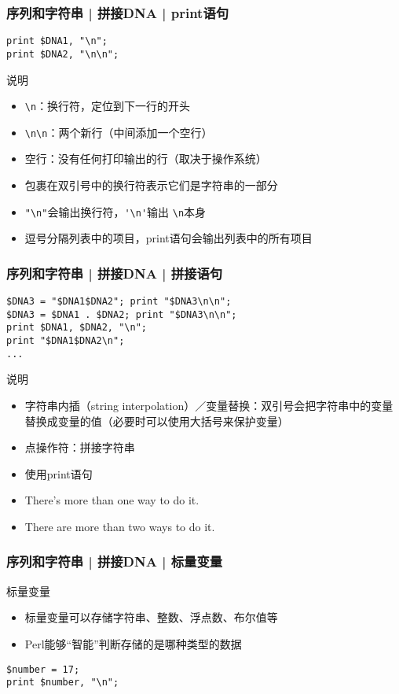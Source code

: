 \begin{frame}[fragile]
  \frametitle{序列和字符串 | 拼接DNA | \alert{print语句}}
  \vspace{-1.5em}
\begin{lstlisting}
print $DNA1, "\n";
print $DNA2, "\n\n";
\end{lstlisting}
\pause
\begin{block}{说明}
  \begin{itemize}
    \item \verb|\n|：换行符，定位到下一行的开头
    \item \verb|\n\n|：两个新行（中间添加一个空行）
    \item 空行：没有任何打印输出的行（取决于操作系统）
    \item 包裹在双引号中的换行符表示它们是字符串的一部分
    \item \verb|"\n"|会输出换行符，\verb|'\n'|输出 \verb|\n|本身
    \item 逗号分隔列表中的项目，print语句会输出列表中的所有项目
  \end{itemize}
\end{block}
\end{frame}

\begin{frame}[fragile]
  \frametitle{序列和字符串 | 拼接DNA | \alert{拼接语句}}
  \vspace{-1.5em}
\begin{lstlisting}
$DNA3 = "$DNA1$DNA2"; print "$DNA3\n\n";
$DNA3 = $DNA1 . $DNA2; print "$DNA3\n\n";
print $DNA1, $DNA2, "\n";
print "$DNA1$DNA2\n";
...
\end{lstlisting}
\begin{block}{说明}
\begin{itemize}
  \item 字符串内插（string interpolation）／变量替换：双引号会把字符串中的变量替换成变量的值（必要时可以使用大括号来保护变量）
  \item 点操作符：拼接字符串
  \item 使用print语句
  \item There's more than one way to do it.
  \item There are more than two ways to do it.
\end{itemize}
\end{block}
\end{frame}

\begin{frame}[fragile]
  \frametitle{序列和字符串 | 拼接DNA | 标量变量}
  \begin{block}{标量变量}
    \begin{itemize}
      \item 标量变量可以存储字符串、整数、浮点数、布尔值等
      \item Perl能够“智能”判断存储的是哪种类型的数据
    \end{itemize}
  \end{block}
  \pause
  \vspace{-1.5em}
\begin{lstlisting}
$number = 17;
print $number, "\n";
\end{lstlisting}
\end{frame}

